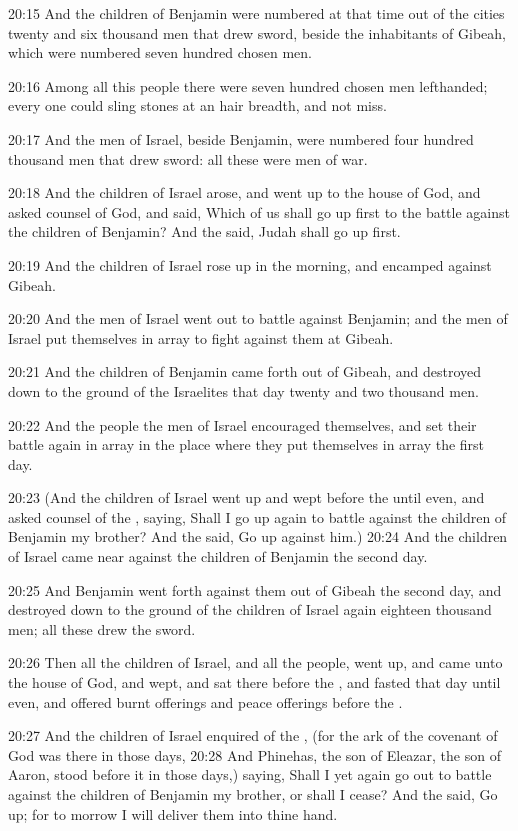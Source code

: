 20:15 And the children of Benjamin were numbered at that time out of the cities twenty and six thousand men that drew sword, beside the inhabitants of Gibeah, which were numbered seven hundred chosen men.

20:16 Among all this people there were seven hundred chosen men lefthanded; every one could sling stones at an hair breadth, and not miss.

20:17 And the men of Israel, beside Benjamin, were numbered four hundred thousand men that drew sword: all these were men of war.

20:18 And the children of Israel arose, and went up to the house of God, and asked counsel of God, and said, Which of us shall go up first to the battle against the children of Benjamin? And the \LORD said, Judah shall go up first.

20:19 And the children of Israel rose up in the morning, and encamped against Gibeah.

20:20 And the men of Israel went out to battle against Benjamin; and the men of Israel put themselves in array to fight against them at Gibeah.

20:21 And the children of Benjamin came forth out of Gibeah, and destroyed down to the ground of the Israelites that day twenty and two thousand men.

20:22 And the people the men of Israel encouraged themselves, and set their battle again in array in the place where they put themselves in array the first day.

20:23 (And the children of Israel went up and wept before the \LORD until even, and asked counsel of the \LORD, saying, Shall I go up again to battle against the children of Benjamin my brother? And the \LORD said, Go up against him.)  20:24 And the children of Israel came near against the children of Benjamin the second day.

20:25 And Benjamin went forth against them out of Gibeah the second day, and destroyed down to the ground of the children of Israel again eighteen thousand men; all these drew the sword.

20:26 Then all the children of Israel, and all the people, went up, and came unto the house of God, and wept, and sat there before the \LORD, and fasted that day until even, and offered burnt offerings and peace offerings before the \LORD.

20:27 And the children of Israel enquired of the \LORD, (for the ark of the covenant of God was there in those days, 20:28 And Phinehas, the son of Eleazar, the son of Aaron, stood before it in those days,) saying, Shall I yet again go out to battle against the children of Benjamin my brother, or shall I cease? And the \LORD said, Go up; for to morrow I will deliver them into thine hand.

